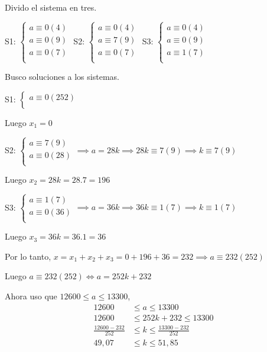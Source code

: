 Divido el sistema en tres.

S1: $ \begin{cases}
    a\equiv 0(4) \\
    a\equiv 0(9) \\
    a\equiv 0(7) \\
\end{cases} $
S2: $ \begin{cases}
    a\equiv 0(4) \\
    a\equiv 7(9) \\
    a\equiv 0(7) \\
\end{cases} $
S3: $ \begin{cases}
    a\equiv 0(4) \\
    a\equiv 0(9) \\
    a\equiv 1(7) \\
\end{cases} $

Busco soluciones a los sistemas.

S1: $ \begin{cases}
    a\equiv 0(252) \\
\end{cases} $

Luego $ x_1 = 0 $

S2: $ \begin{cases}
    a\equiv 7(9) \\
    a\equiv 0(28) \\
\end{cases} \implies a = 28k \implies 28k \equiv 7(9) \implies k \equiv 7(9) $

Luego $ x_2 = 28k = 28.7 = 196$

S3: $ \begin{cases}
    a\equiv 1(7) \\
    a\equiv 0(36) \\
\end{cases} \implies a = 36k \implies 36k \equiv 1(7) \implies k \equiv 1(7) $

Luego $ x_3 = 36k = 36.1 = 36$

Por lo tanto, $ x = x_1 + x_2 + x_3 = 0+196+36 = 232 \implies a \equiv 232(252) $

Luego $ a \equiv 232(252) \iff a = 252k+232 $

Ahora uso que $ 12600 \leq a \leq 13300 $,
\begin{align*}
    12600 &\leq a \leq 13300 \\
    12600 &\leq 252k+232 \leq 13300 \\
    \frac{12600-232}{252} &\leq k \leq \frac{13300-232}{252} \\
    49,07 &\leq k \leq 51,85 \\
\end{align*}

